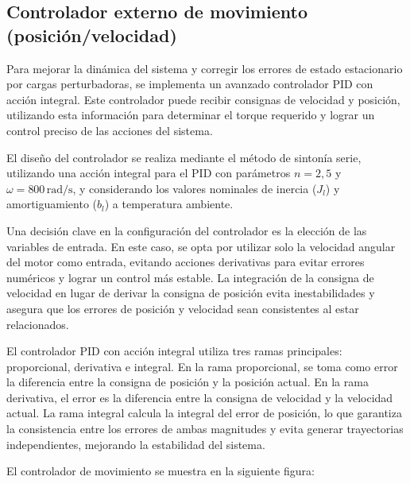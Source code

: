 \documentclass{article}
\begin{document}

\subsection{Controlador externo de movimiento (posición/velocidad)}

Para mejorar la dinámica del sistema y corregir los errores de estado estacionario por cargas perturbadoras, 
se implementa un avanzado controlador PID con acción integral. Este controlador puede recibir consignas de 
velocidad y posición, utilizando esta información para determinar el torque requerido y lograr un control 
preciso de las acciones del sistema.

El diseño del controlador se realiza mediante el método de sintonía serie, utilizando una acción integral 
para el PID con parámetros $n=2,5$ y $\omega=800 \, \text{rad/s}$, y considerando los valores nominales de 
inercia ($J_l$) y amortiguamiento ($b_l$) a temperatura ambiente.

Una decisión clave en la configuración del controlador es la elección de las variables de entrada. En este 
caso, se opta por utilizar solo la velocidad angular del motor como entrada, evitando acciones derivativas 
para evitar errores numéricos y lograr un control más estable. La integración de la consigna de velocidad 
en lugar de derivar la consigna de posición evita inestabilidades y asegura que los errores de posición y 
velocidad sean consistentes al estar relacionados.

El controlador PID con acción integral utiliza tres ramas principales: proporcional, derivativa e integral. 
En la rama proporcional, se toma como error la diferencia entre la consigna de posición y la posición actual.
En la rama derivativa, el error es la diferencia entre la consigna de velocidad y la velocidad actual. La 
rama integral calcula la integral del error de posición, lo que garantiza la consistencia entre los errores 
de ambas magnitudes y evita generar trayectorias independientes, mejorando la estabilidad del sistema.

El controlador de movimiento se muestra en la siguiente figura: 

\end{document}
